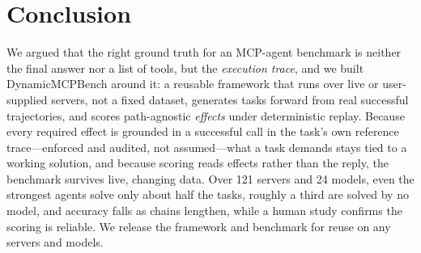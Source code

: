 \section{Conclusion}
\label{sec:conclusion}
We argued that the right ground truth for an MCP-agent benchmark is neither
the final answer nor a list of tools, but the \emph{execution trace}, and we
built DynamicMCPBench around it: a reusable framework that runs over live
or user-supplied servers, not a fixed dataset, generates tasks forward from
real successful trajectories, and scores path-agnostic \emph{effects} under
deterministic replay. Because every required effect is grounded in a successful
call in the task's own reference trace---enforced and audited, not assumed---what
a task demands stays tied to a working solution, and because scoring reads
effects rather than the reply, the benchmark survives live, changing data. Over
121 servers and 24 models, even the strongest agents solve only about half the
tasks, roughly a third are solved by no model, and accuracy falls as chains
lengthen, while a human study confirms the scoring is reliable. We release the
framework and benchmark for reuse on any servers and models.
